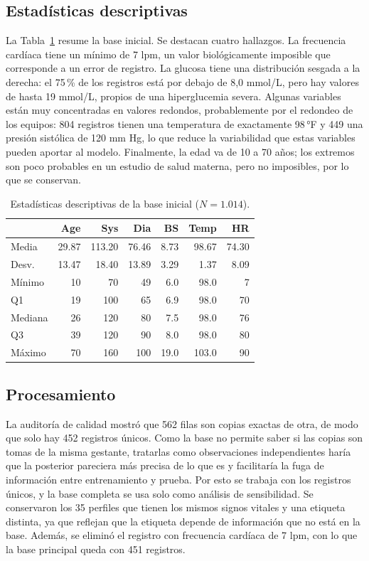 \subsection{Estadísticas descriptivas}
La Tabla~\ref{tab:descriptivas} resume la base inicial. Se destacan cuatro
hallazgos. La frecuencia cardíaca tiene un mínimo de 7 lpm, un valor
biológicamente imposible que corresponde a un error de registro. La glucosa
tiene una distribución sesgada a la derecha: el 75\,\% de los registros está por
debajo de 8,0 mmol/L, pero hay valores de hasta 19 mmol/L, propios de una
hiperglucemia severa. Algunas variables están muy concentradas en valores
redondos, probablemente por el redondeo de los equipos: 804 registros tienen una
temperatura de exactamente 98\,°F y 449 una presión sistólica de 120 mm Hg, lo
que reduce la variabilidad que estas variables pueden aportar al modelo.
Finalmente, la edad va de 10 a 70 años; los extremos son poco probables en un
estudio de salud materna, pero no imposibles, por lo que se conservan.

\begin{table}[h]
\centering
\caption{Estadísticas descriptivas de la base inicial ($N=1.014$).}
\label{tab:descriptivas}
\small
\setlength{\tabcolsep}{3.5pt}
\begin{tabular}{lrrrrrr}
\toprule
 & Age & Sys & Dia & BS & Temp & HR\\
\midrule
Media    & 29.87 & 113.20 & 76.46 & 8.73 & 98.67 & 74.30\\
Desv.    & 13.47 & 18.40 & 13.89 & 3.29 & 1.37 & 8.09\\
Mínimo   & 10 & 70 & 49 & 6.0 & 98.0 & 7\\
Q1       & 19 & 100 & 65 & 6.9 & 98.0 & 70\\
Mediana  & 26 & 120 & 80 & 7.5 & 98.0 & 76\\
Q3       & 39 & 120 & 90 & 8.0 & 98.0 & 80\\
Máximo   & 70 & 160 & 100 & 19.0 & 103.0 & 90\\
\bottomrule
\end{tabular}
\end{table}

\subsection{Procesamiento}
La auditoría de calidad mostró que 562 filas son copias exactas de otra, de modo
que solo hay 452 registros únicos. Como la base no permite saber si las copias
son tomas de la misma gestante, tratarlas como observaciones independientes
haría que la posterior pareciera más precisa de lo que es y facilitaría la fuga
de información entre entrenamiento y prueba. Por esto se trabaja con los
registros únicos, y la base completa se usa solo como análisis de sensibilidad.
Se conservaron los 35 perfiles que tienen los mismos signos vitales y una
etiqueta distinta, ya que reflejan que la etiqueta depende de información que no
está en la base. Además, se eliminó el registro con frecuencia cardíaca de 7 lpm,
con lo que la base principal queda con 451 registros.

